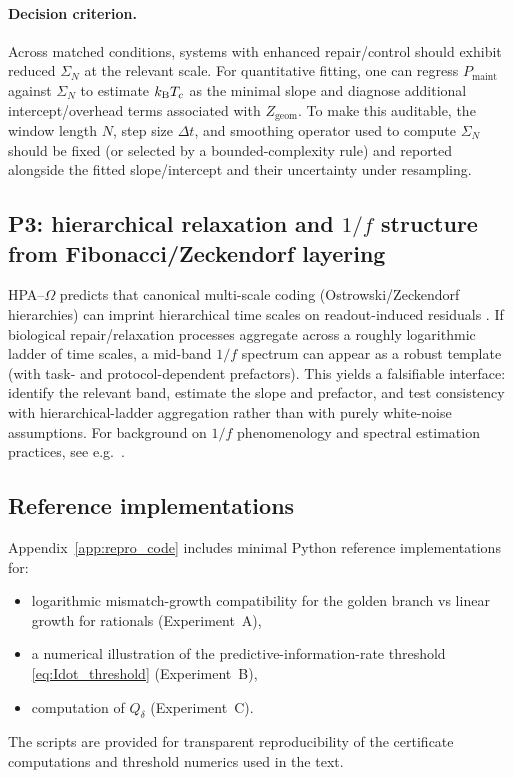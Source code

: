 \paragraph{Decision criterion.}
Across matched conditions, systems with enhanced repair/control should exhibit reduced $\Sigma_N$ at the relevant scale.
For quantitative fitting, one can regress $P_{\mathrm{maint}}$ against $\Sigma_N$ to estimate $k_{\mathrm{B}} T_c$ as the minimal slope and diagnose additional intercept/overhead terms associated with $Z_{\mathrm{geom}}$.
To make this auditable, the window length $N$, step size $\Delta t$, and smoothing operator used to compute $\Sigma_N$ should be fixed (or selected by a bounded-complexity rule) and reported alongside the fitted slope/intercept and their uncertainty under resampling.

\subsection{P3: hierarchical relaxation and \texorpdfstring{$1/f$}{1/f} structure from Fibonacci/Zeckendorf layering}
\label{sec:test_P3}

HPA--$\Omega$ predicts that canonical multi-scale coding (Ostrowski/Zeckendorf hierarchies) can imprint hierarchical time scales on readout-induced residuals \cite{Ma2025HPT}.
If biological repair/relaxation processes aggregate across a roughly logarithmic ladder of time scales, a mid-band $1/f$ spectrum can appear as a robust template (with task- and protocol-dependent prefactors).
This yields a falsifiable interface: identify the relevant band, estimate the slope and prefactor, and test consistency with hierarchical-ladder aggregation rather than with purely white-noise assumptions.
For background on $1/f$ phenomenology and spectral estimation practices, see e.g.\ \cite{Milotti2002}.

\subsection{Reference implementations}
\label{sec:reference_impl}

Appendix~\ref{app:repro_code} includes minimal Python reference implementations for:
\begin{itemize}
  \item logarithmic mismatch-growth compatibility for the golden branch vs linear growth for rationals (Experiment~A),
  \item a numerical illustration of the predictive-information-rate threshold \eqref{eq:Idot_threshold} (Experiment~B),
  \item computation of $Q_\delta$ (Experiment~C).
\end{itemize}
The scripts are provided for transparent reproducibility of the certificate computations and threshold numerics used in the text.


